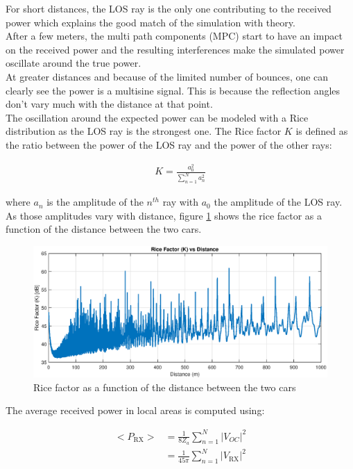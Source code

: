 \documentclass[10pt,a4paper]{ULBreport}
\begin{document}
For short distances, the LOS ray is the only one contributing to the received power which explains the good match of the simulation with theory. \\
After a few meters, the multi path components (MPC) start to have an impact on the received power and the resulting interferences make the simulated power oscillate around the true power. \\
At greater distances and because of the limited number of bounces, one can clearly see the power is a multisine signal. This is because the reflection angles don't vary much with the distance at that point.\\

The oscillation around the expected power can be modeled with a Rice distribution as the LOS ray is the strongest one. The Rice factor $K$ is defined as the ratio between the power of the LOS ray and the power of the other rays:

\begin{align*}
    K = \frac{a_0^2}{\sum_{n=1}^{N}a_n^2}
\end{align*}

where $a_n$ is the amplitude of the $n^{th}$ ray with $a_0$ the amplitude of the LOS ray. As those amplitudes vary with distance, figure \ref{fig:K(d)} shows the rice factor as a function of the distance between the two cars. 

\begin{figure}[H]
    \centering
    \includegraphics[width=1\textwidth]{3_4.eps}
    \caption{Rice factor as a function of the distance between the two cars}
    \label{fig:K(d)}
\end{figure}

The average received power in local areas is computed using:

\begin{align*}
    <P_{\text{RX}}> &= \frac{1}{8 Z_a} \sum_{n=1}^{N} \left| V_{OC} \right|^2\\
    &= \frac{1}{45\pi} \sum_{n=1}^{N} \left| V_{\text{RX}} \right|^2\\
\end{align*}
\end{document}
